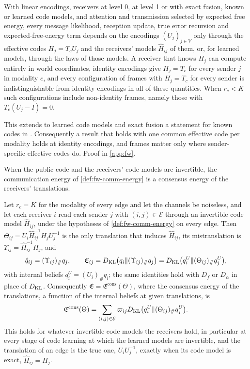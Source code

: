 \begin{proposition}\label{prop:fw-effective-codes}
With linear encodings, receivers at level 0, at level 1 or with exact fusion, known or learned code models, and attention and transmission selected by expected free energy, every message likelihood, reception update, true error recursion and expected-free-energy term depends on the encodings $(U_j)_{j\in V}$ only through the effective codes $H_j=T_cU_j$ and the receivers' models $\hat H_{ij}$ of them, or, for learned models, through the laws of those models. A receiver that knows $H_j$ can compute entirely in world coordinates, identity encodings give $H_j=T_c$ for every sender $j$ in modality $c$, and every configuration of frames with $H_j=T_c$ for every sender is indistinguishable from identity encodings in all of these quantities. When $r_c<K$ such configurations include non-identity frames, namely those with $T_c(U_j-I)=0$.
\end{proposition}

This extends to learned code models and exact fusion a statement for known codes in \citet{dennis2026communicating}. Consequently a result that holds with one common effective code per modality holds at identity encodings, and frames matter only where sender-specific effective codes do. Proof in \cref{app:fw}.

When the public code and the receivers' code models are invertible, the communication energy of \cref{def:fw-comm-energy} is a consensus energy of the receivers' translations.

\begin{proposition}\label{prop:fw-full-rank-energy}
Let $r_c=K$ for the modality of every edge and let the channels be noiseless, and let each receiver $i$ read each sender $j$ with $(i,j)\in\mathcal E$ through an invertible code model $\hat H_{ij}$, under the hypotheses of \cref{def:fw-comm-energy} on every edge. Then $\Theta_{ij}=U_i\hat H_{ij}^{-1}H_jU_j^{-1}$ is the only translation that induces $\hat H_{ij}$, its mistranslation is $\Upsilon_{ij}=\hat H_{ij}^{-1}H_j$, and
\[
\hat q_{ij}=(\Upsilon_{ij})_\#q_j,\qquad\mathfrak E_{ij}=D_{\mathrm{KL}}\bigl(q_i\Vert(\Upsilon_{ij})_\#q_j\bigr)=D_{\mathrm{KL}}\bigl(q^U_i\Vert(\Theta_{ij})_\#q^U_j\bigr),
\]
with internal beliefs $q^U_i=(U_i)_\#q_i$; the same identities hold with $D_f$ or $D_\alpha$ in place of $D_{\mathrm{KL}}$. Consequently $\mathfrak E=\mathfrak E^{\mathrm{cons}}(\Theta)$, where the consensus energy of the translations, a function of the internal beliefs at given translations, is
\[
\mathfrak E^{\mathrm{cons}}(\Theta)=\sum_{(i,j)\in\mathcal E}\varpi_{ij}D_{\mathrm{KL}}\bigl(q^U_i\Vert(\Theta_{ij})_\#q^U_j\bigr).
\]
This holds for whatever invertible code models the receivers hold, in particular at every stage of code learning at which the learned models are invertible, and the translation of an edge is the true one, $U_iU_j^{-1}$, exactly when its code model is exact, $\hat H_{ij}=H_j$.
\end{proposition}

